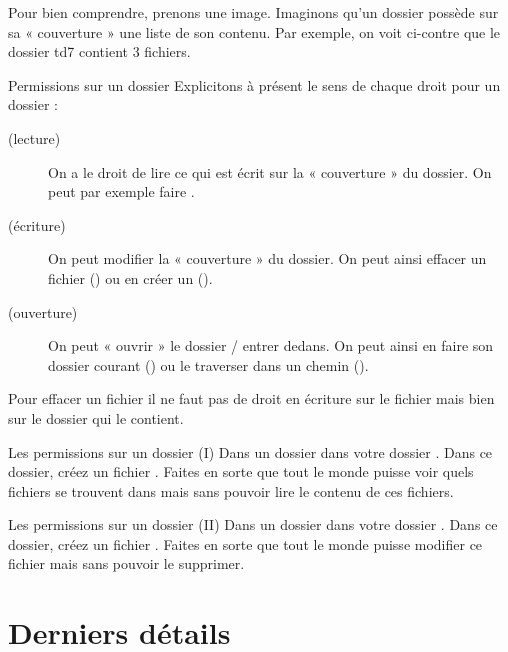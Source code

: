\documentclass[a4paper,11pt]{style-esi/td}
\begin{document}
		Pour bien comprendre, prenons une image.
		Imaginons qu'un dossier possède sur sa « couverture » une liste de son contenu. 
		Par exemple, on voit ci-contre que le dossier td7 contient 3 fichiers.
		
		\begin{theorie}{Permissions sur un dossier}
			Explicitons à présent le sens de chaque droit pour un dossier :
			\begin{description}
			\item[ (lecture)] 
				On a le droit de lire ce qui est écrit sur la « couverture » du dossier. 
				On peut par exemple faire .
			\item[ (écriture)] 
				On peut modifier la « couverture » du dossier. 
				On peut ainsi effacer un fichier ()
				ou en créer un (). 
			\item[ (ouverture)]
				On peut « ouvrir » le dossier / entrer dedans. 
				On peut ainsi en faire son dossier courant () 
				ou le traverser dans un chemin ().				
			\end{description}
		\end{theorie}

		\begin{alertbox}
			Pour effacer un fichier 
			il ne faut pas de droit en écriture sur le fichier 
			mais bien sur le dossier qui le contient.
		\end{alertbox}
		
		\begin{Exercice}{Les permissions sur un dossier (I)}           
			Dans un dossier  dans votre dossier .
			Dans ce dossier, créez un fichier .
			Faites en sorte que tout le monde puisse voir 
			quels fichiers se trouvent dans 
			mais sans pouvoir lire le contenu de ces fichiers.
		\end{Exercice}

		\begin{Exercice}{Les permissions sur un dossier (II)}           
			Dans un dossier  dans votre dossier .
			Dans ce dossier, créez un fichier .
			Faites en sorte que tout le monde puisse modifier ce fichier 
			mais sans pouvoir le supprimer.
		\end{Exercice}

	\section{Derniers détails}
\end{document}
